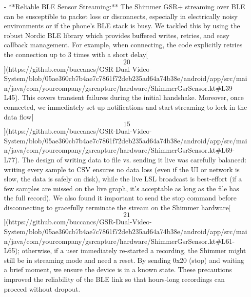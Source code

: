 \documentclass[12pt,a4paper]{article}
\begin{document}
{- **Reliable BLE Sensor Streaming:** The Shimmer GSR+ streaming over BLE
  can be susceptible to packet loss or disconnects, especially in
  electrically noisy environments or if the phone's BLE stack is busy.
  We tackled this by using the robust Nordic BLE library which provides
  buffered writes, retries, and easy callback management. For example,
  when connecting, the code explicitly retries the connection up to 3
  times with a short
  delay[\[20\]](https://github.com/buccancs/GSR-Dual-Video-System/blob/05ae360cb7b4ae7c7861f72deb235ad64a74b38e/android/app/src/main/java/com/yourcompany/gsrcapture/hardware/ShimmerGsrSensor.kt#L39-L45).
  This covers transient failures during the initial handshake. Moreover,
  once connected, we immediately set up notifications and start
  streaming to lock in the data
  flow[\[15\]](https://github.com/buccancs/GSR-Dual-Video-System/blob/05ae360cb7b4ae7c7861f72deb235ad64a74b38e/android/app/src/main/java/com/yourcompany/gsrcapture/hardware/ShimmerGsrSensor.kt#L69-L77).
  The design of writing data to file vs. sending it live was carefully
  balanced: writing every sample to CSV ensures no data loss (even if
  the UI or network is slow, the data is safely on disk), while the live
  LSL broadcast is best-effort (if a few samples are missed on the live
  graph, it's acceptable as long as the file has the full record). We
  also found it important to send the stop command before disconnecting
  to gracefully terminate the stream on the Shimmer
  hardware[\[21\]](https://github.com/buccancs/GSR-Dual-Video-System/blob/05ae360cb7b4ae7c7861f72deb235ad64a74b38e/android/app/src/main/java/com/yourcompany/gsrcapture/hardware/ShimmerGsrSensor.kt#L61-L65);
  otherwise, if a user immediately re-started a recording, the Shimmer
  might still be in streaming mode and need a reset. By sending 0x20
  (stop) and waiting a brief moment, we ensure the device is in a known
  state. These precautions improved the reliability of the BLE link so
  that hours-long recordings can proceed without dropout.

}
\end{document}

